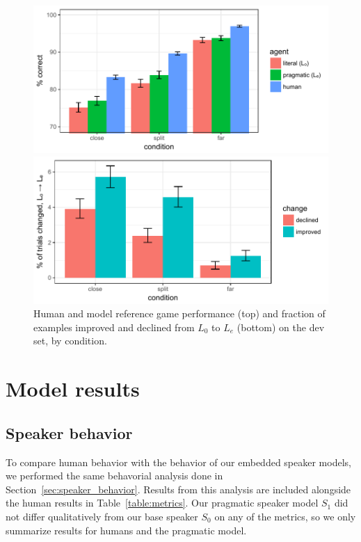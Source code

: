 \documentclass[11pt,letterpaper]{article}
\newcommand{\Listener}{L}
\newcommand{\Speaker}{S}
\renewcommand{\|}{\mid}
\newcommand{\secref}[1]{Section~\ref{#1}}
\newcommand{\Tabref}[1]{Table~\ref{#1}}
\begin{document}
\begin{figure}
\includegraphics[scale = .5]{figures/listenerAccuracy}

\includegraphics[scale = .5]{figures/changedByCondition.pdf}
\caption{Human and model reference game performance (top) and fraction of examples improved and
declined from $\Listener_0$ to $\Listener_e$ (bottom) on the dev set, by condition.}
\label{fig:listenerAccuracy}
\end{figure}

\section{Model results}

\subsection{Speaker behavior}

To compare human behavior with the behavior of our embedded speaker models,
we performed the same behavorial analysis done in \secref{sec:speaker_behavior}.
Results from this analysis are included alongside the human results in
\Tabref{table:metrics}.
Our pragmatic speaker model $\Speaker_1$ did not differ
qualitatively from our base speaker $\Speaker_0$ on any of the metrics,
so we only summarize results for humans and the pragmatic model.
\end{document}
